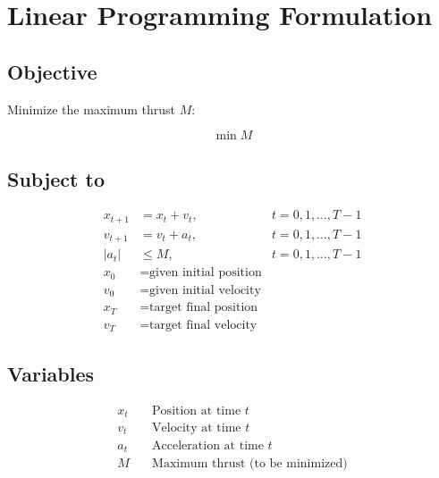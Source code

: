 \documentclass{article}
\begin{document}
\section*{Linear Programming Formulation}

\subsection*{Objective}
Minimize the maximum thrust \( M \):

\[
\min M
\]

\subsection*{Subject to}

\begin{align*}
x_{t+1} &= x_t + v_t, & t = 0, 1, \ldots, T-1\\
v_{t+1} &= v_t + a_t, & t = 0, 1, \ldots, T-1\\
|a_t| &\leq M, & t = 0, 1, \ldots, T-1\\
x_0 &= \text{given initial position} &\\
v_0 &= \text{given initial velocity} &\\
x_T &= \text{target final position} &\\
v_T &= \text{target final velocity} &
\end{align*}

\subsection*{Variables}
\begin{align*}
x_t &\quad \text{Position at time } t \\
v_t &\quad \text{Velocity at time } t \\
a_t &\quad \text{Acceleration at time } t \\
M &\quad \text{Maximum thrust (to be minimized)}
\end{align*}
\end{document}
